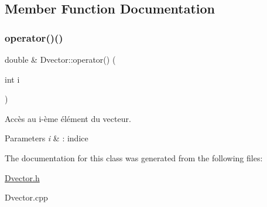 \subsection{Member Function Documentation}
\hypertarget{class_dvector_ae355bf2da1777227c39e5687810c1b41}{}\label{class_dvector_ae355bf2da1777227c39e5687810c1b41} 
\subsubsection{\texorpdfstring{operator()()}{operator()()}}
{\footnotesize\ttfamily double \& Dvector\+::operator() (\begin{DoxyParamCaption}\item[{int}]{i }\end{DoxyParamCaption})}



Accès au i-\/ème élément du vecteur. 


\begin{DoxyParams}{Parameters}
{\em i} & \+: indice \\
\hline
\end{DoxyParams}


The documentation for this class was generated from the following files\+:\begin{DoxyCompactItemize}
\item 
\hyperlink{_dvector_8h}{Dvector.\+h}\item 
Dvector.\+cpp\end{DoxyCompactItemize}

